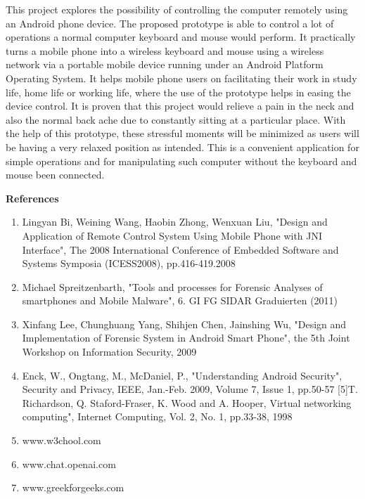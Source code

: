 \documentclass[12pt]{article}
\begin{document}
This project explores the possibility of controlling the computer remotely using
an Android phone device. The proposed prototype is able to control a lot of
operations a normal computer keyboard and mouse would perform. It
practically turns a mobile phone into a wireless keyboard and mouse using a
wireless network via a portable mobile device running under an Android
Platform Operating System. It helps mobile phone users on facilitating their
work in study life, home life or working life, where the use of the prototype
helps in easing the device control. It is proven that this project would relieve a
pain in the neck and also the normal back ache due to constantly sitting at a
particular place. With the help of this prototype, these stressful moments will
be minimized as users will be having a very relaxed position as intended. This is
a convenient application for simple operations and for manipulating such
computer without the keyboard and mouse been connected.


\clearpage

\begin{center}

\LARGE \textbf{References }\\[5mm]
\end{center}

\begin{enumerate}

\item  Lingyan Bi, Weining Wang, Haobin Zhong, Wenxuan Liu, "Design and 
Application of Remote Control System Using Mobile Phone with JNI Interface", The 
2008 International Conference of Embedded Software and Systems Symposia 
(ICESS2008), pp.416-419.2008 

\item Michael Spreitzenbarth, "Tools and processes for Forensic Analyses of 
smartphones and Mobile Malware", 6. GI FG SIDAR Graduierten 
(2011)

\item Xinfang Lee, Chunghuang Yang, Shihjen Chen, Jainshing Wu, "Design and 
Implementation of Forensic System in Android Smart Phone", the 5th Joint 
Workshop on Information Security, 2009 

\item Enck, W., Ongtang, M., McDaniel, P., "Understanding Android Security", Security 
and Privacy, IEEE, Jan.-Feb. 2009, Volume 7, Issue 1, pp.50-57 [5]T. Richardson, Q. 
Staford-Fraser, K. Wood and A. Hooper, Virtual networking computing", Internet 
Computing, Vol. 2, No. 1, pp.33-38, 1998 

\item  www.w3chool.com

\item  www.chat.openai.com

\item www.greekforgeeks.com

\end{enumerate}


 
\end{document}
